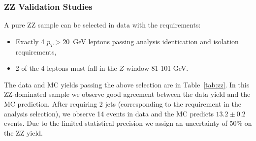 \clearpage

\subsubsection{ZZ Validation Studies}
\label{sec:bkg_zz}

A pure ZZ sample can be selected in data with the requirements:

\begin{itemize}
\item Exactly 4 $p_T>20$~GeV leptons passing analysis identication and isolation requirements,
\item 2 of the 4 leptons must fall in the $Z$ window 81-101 GeV.
\end{itemize}

The data and MC yields passing the above selection are in Table~\ref{tab:zz}. 
In this ZZ-dominated sample we observe good agreement between the data yield and the MC prediction.
After requiring 2 jets (corresponding to the requirement in the analysis selection), we observe 14 events
in data and the MC predicts $13.2\pm0.2$ events. Due to the limited statistical precision we assign an uncertainty
of 50\% on the ZZ yield.

